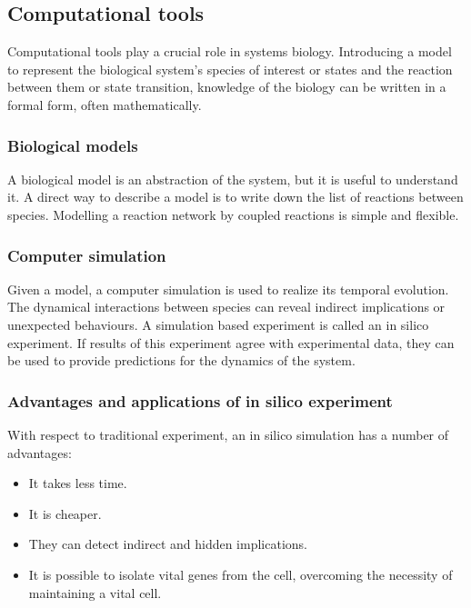   \subsection{Computational tools}
  Computational tools play a crucial role in systems biology.
  Introducing a model to represent the biological system's species of interest or states and the reaction between them or state transition, knowledge of the biology can be written in a formal form, often mathematically.

    \subsubsection{Biological models}
    A biological model is an abstraction of the system, but it is useful to understand it.
    A direct way to describe a model is to write down the list of reactions between species.
    Modelling a reaction network by coupled reactions is simple and flexible.

    \subsubsection{Computer simulation}
    Given a model, a computer simulation is used to realize its temporal evolution.
    The dynamical interactions between species can reveal indirect implications or unexpected behaviours.
    A simulation based experiment is called an in silico experiment.
    If results of this experiment agree with experimental data, they can be used to provide predictions for the dynamics of the system.

    \subsubsection{Advantages and applications of in silico experiment}
    With respect to traditional experiment, an in silico simulation has a number of advantages:

    \begin{multicols}{2}
      \begin{itemize}
        \item It takes less time.
        \item It is cheaper.
        \item They can detect indirect and hidden implications.
        \item It is possible to isolate vital genes from the cell, overcoming the necessity of maintaining a vital cell.
      \end{itemize}
    \end{multicols}

